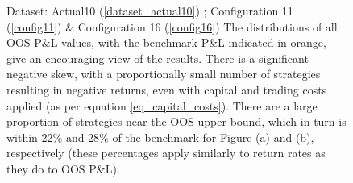 \documentclass[a4paper,11pt,oneside]{article}
\theoremstyle{plain}
\theoremstyle{definition}
\begin{document}
\begin{figure}[H]
\begin{subfigure}{.5\textwidth}
		\end{subfigure}
		\caption[MMS OOS P\&L Distributions]{Dataset: Actual10 (\ref{dataset_actual10}) ; Configuration 11 (\ref{config11}) \&  Configuration 16 (\ref{config16})
			\newline The distributions of all OOS P\&L values, with the benchmark P\&L indicated in orange, give an encouraging view of the results. There is a significant negative skew, with a proportionally small number of strategies resulting in negative returns, even with capital and trading costs applied (as per equation \eqref{eq_capital_costs}). There are a large proportion of strategies near the OOS upper bound, which in turn is within 22\% and 28\% of the benchmark for Figure (a) and (b), respectively (these percentages apply similarly to return rates as they do to OOS P\&L).
		}
		\label{results_pl_pdf_cost}
	\end{figure}
	
\end{document}
